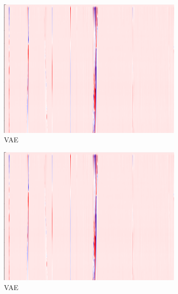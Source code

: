 \begin{figure}[h]
    \begin{subfigure}{0.33\textwidth}
        \includegraphics[width=\textwidth]{figures/test.png}
        \caption{VAE}
    \end{subfigure}%
    \hfill
    \begin{subfigure}{0.33\textwidth}
        \includegraphics[width=\textwidth]{figures/test.png}
        \caption{VAE}
    \end{subfigure}%
    \hfill
    \begin{subfigure}{0.33\textwidth}

\end{subfigure}
\end{figure}
